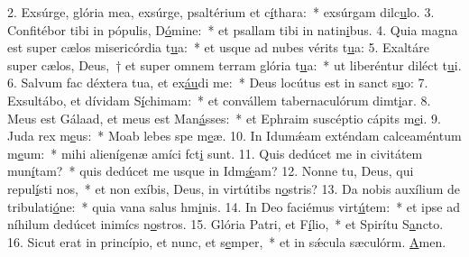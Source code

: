 2. Exsúrge, glória mea, exsúrge, psaltérium et c\uline{í}thara:~* exsúrgam dilc\uline{u}lo.
3. Confitébor tibi in pópulis, D\uline{ó}mine:~* et psallam tibi in natin\uline{i}bus.
4. Quia magna est super cælos misericórdia t\uline{u}a:~* et usque ad nubes vérits t\uline{u}a:
5. Exaltáre super cælos, Deus,~† et super omnem terram glória t\uline{u}a:~* ut liberéntur diléct t\uline{u}i.
6. Salvum fac déxtera tua, et ex\uline{áu}di me:~* Deus locútus est in sanct s\uline{u}o:
7. Exsultábo, et dívidam S\uline{í}chimam:~* et convállem tabernaculórum dimt\uline{i}ar.
8. Meus est Gálaad, et meus est Man\uline{á}sses:~* et Ephraim suscéptio cápits m\uline{e}i.
9. Juda rex m\uline{e}us:~* Moab lebes spe m\uline{e}æ.
10. In Idumǽam exténdam calceaméntum m\uline{e}um:~* mihi alienígenæ amíci fct\uline{i} sunt.
11. Quis dedúcet me in civitátem mun\uline{í}tam?~* quis dedúcet me usque in Idm\uline{ǽ}am?
12. Nonne tu, Deus, qui repul\uline{í}sti nos,~* et non exíbis, Deus, in virtútibs n\uline{o}stris?
13. Da nobis auxílium de tribulati\uline{ó}ne:~* quia vana salus hm\uline{i}nis.
14. In Deo faciémus virt\uline{ú}tem:~* et ipse ad níhilum dedúcet inimícs n\uline{o}stros.
15. Glória Patri, et F\uline{í}lio,~* et Spirítu S\uline{a}ncto.
16. Sicut erat in princípio, et nunc, et s\uline{e}mper,~* et in sǽcula sæculórm. \uline{A}men.
